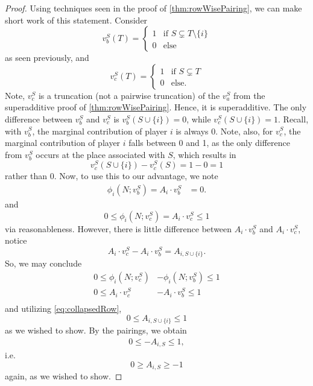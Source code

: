 \documentclass[12pt,letterpaper,final]{article}
\theoremstyle{plain}
\theoremstyle{plain}
\theoremstyle{plain}
\theoremstyle{plain}
\theoremstyle{plain}
\theoremstyle{plain}
\theoremstyle{plain}
\theoremstyle{definition}
\theoremstyle{definition}
\theoremstyle{definition}
\theoremstyle{definition}
\theoremstyle{definition}
\theoremstyle{remark}
\theoremstyle{remark}
\theoremstyle{remark}
\theoremstyle{remark}
\begin{document}
\begin{proof}
  Using techniques seen in the proof of \cref{thm:rowWisePairing}, we
  can make short work of this statement.
  Consider
  \[
    v^S_b(T) =
    \begin{cases}
      1 & \text{if } S \subsetneq T\setminus\{i\}\\
      0 & \text{else}
    \end{cases}
  \]
  as seen previously, and
  \[
    v^S_c(T) =
    \begin{cases}
      1 & \text{if } S \subsetneq T\\
      0 & \text{else}.
    \end{cases}
  \]
  Note, \(v^S_c\) is a truncation (not a pairwise truncation) of the \(v^S_a\) from the
  superadditive proof of \cref{thm:rowWisePairing}. Hence, it is
  superadditive. The only difference between \(v^S_b\) and \(v^S_c\) is
  \(v^S_b(S\cup\{i\}) = 0\), while \(v^S_c(S\cup\{i\}) = 1\). Recall, with
  \(v^S_b\), the marginal contribution of player \(i\) is always
  0. Note, also, for \(v^S_c\), the marginal contribution of player
  \(i\) falls between 0 and 1, as the only difference from \(v^S_b\)
  occurs at the place associated with \(S\), which results in
  \[
    v^S_c(S\cup\{i\}) -v^S_c(S) = 1-0 = 1
  \]
  rather than 0.
  Now, to use this to our advantage, we note
  \begin{align*}
    \phi_i(N;v^S_b) = A_i \cdot v^S_b &= 0.
  \end{align*}
  and
  \begin{equation*}
    0\leq \phi_i(N;v^S_c) = A_i \cdot v^S_c \leq 1
  \end{equation*}
  via reasonableness. However, there is little difference
  between \(A_i \cdot v^S_b\) and \(A_i \cdot v^S_c\), notice
  \begin{equation}\label{eq:collapsedRow}
    A_i \cdot v^S_c - A_i \cdot v^S_b = A_{i,S\cup\{i\}}.
  \end{equation}
  So, we may conclude
  \begin{align*}
    0\leq\phi_i(N;v^S_c) &- \phi_i(N;v^S_b) \leq 1\\
    0\leq A_i \cdot v^S_c &- A_i \cdot v^S_b \leq 1\\
  \end{align*}
  and utilizing \cref{eq:collapsedRow},
  \begin{equation}
    0\leq A_{i,S\cup\{i\}} \leq 1
  \end{equation}
  as we wished to show. By the pairings, we obtain
  \begin{align*}
    0\leq -A_{i,S} \leq 1,
  \end{align*}
  i.e.
  \begin{equation}
    0\geq A_{i,S} \geq -1
  \end{equation}
  again, as we wished to show.
\end{proof}
\end{document}
